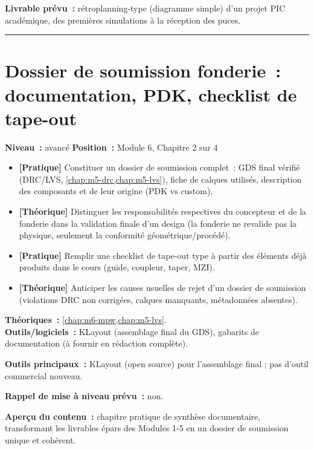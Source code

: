 \noindent\textbf{Livrable prévu~:} rétroplanning-type (diagramme simple) d'un projet PIC académique, des premières simulations à la réception des puces.

\bigskip\hrule\bigskip

\chapter{Dossier de soumission fonderie~: documentation, PDK, checklist de tape-out}
\label{chap:m6-dossier}

\noindent\textbf{Niveau~:} avancé \hfill \textbf{Position~:} Module 6, Chapitre 2 sur 4

\begin{objectifs}
\begin{itemize}[leftmargin=1.4em]
  \item \textbf{[Pratique]} Constituer un dossier de soumission complet~: GDS final vérifié (DRC/LVS, \cref{chap:m5-drc,chap:m5-lvs}), fiche de calques utilisés, description des composants et de leur origine (PDK vs custom).
  \item \textbf{[Théorique]} Distinguer les responsabilités respectives du concepteur et de la fonderie dans la validation finale d'un design (la fonderie ne revalide pas la physique, seulement la conformité géométrique/procédé).
  \item \textbf{[Pratique]} Remplir une checklist de tape-out type à partir des éléments déjà produits dans le cours (guide, coupleur, taper, MZI).
  \item \textbf{[Théorique]} Anticiper les causes usuelles de rejet d'un dossier de soumission (violations DRC non corrigées, calques manquants, métadonnées absentes).
\end{itemize}
\end{objectifs}

\begin{prerequis}
\textbf{Théoriques~:} \cref{chap:m6-mpw,chap:m5-lvs}.\\
\textbf{Outils/logiciels~:} KLayout (assemblage final du GDS), gabarits de documentation (à fournir en rédaction complète).
\end{prerequis}

\noindent\textbf{Outils principaux~:} KLayout (open source) pour l'assemblage final ; pas d'outil commercial nouveau.

\noindent\textbf{Rappel de mise à niveau prévu~:} non.

\noindent\textbf{Aperçu du contenu~:} chapitre pratique de synthèse documentaire, transformant les livrables épars des Modules 1-5 en un dossier de soumission unique et cohérent.

